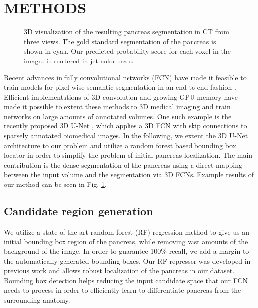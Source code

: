 \documentclass[a4paper]{spie}  %
\begin{document}
\section{METHODS}
\begin{figure}[tb]
  \centering
  \vspace{1em}
\caption{ 3D visualization of the resulting pancreas segmentation in CT from three views. The gold standard segmentation of the pancreas is shown in cyan. Our predicted probability score for each voxel in the images is rendered in jet color scale. \label{fig:result_3D_view}}
\end{figure}
Recent advances in fully convolutional networks (FCN) have made it feasible to train models for pixel-wise semantic segmentation in an end-to-end fashion \cite{long2015fully}. Efficient implementations of 3D convolution and growing GPU memory have made it possible to extent these methods to 3D medical imaging and train networks on large amounts of annotated volumes. One such example is the recently proposed 3D U-Net \cite{cciccek20163d}, which applies a 3D FCN with skip connections to sparsely annotated biomedical images. In the following, we extent the 3D U-Net architecture to our problem and utilize a random forest based bounding box locator in order to simplify the problem of initial pancreas localization. The main contribution is the dense segmentation of the pancreas using a direct mapping between the input volume and the segmentation via 3D FCNs. Example results of our method can be seen in Fig. \ref{fig:result_3D_view}.

\subsection{Candidate region generation} We utilize a state-of-the-art random forest (RF) regression method to give us an initial bounding box region of the pancreas, while removing vast amounts of the background of the image. In order to guarantee 100\% recall, we add a margin to the automatically generated bounding boxes. Our RF repressor was developed in previous work \cite{oda2016regression} and allows robust localization of the pancreas in our dataset. Bounding box detection helps reducing the input candidate space that our FCN needs to process in order to efficiently learn to differentiate pancreas from the surrounding anatomy.
\end{document}

